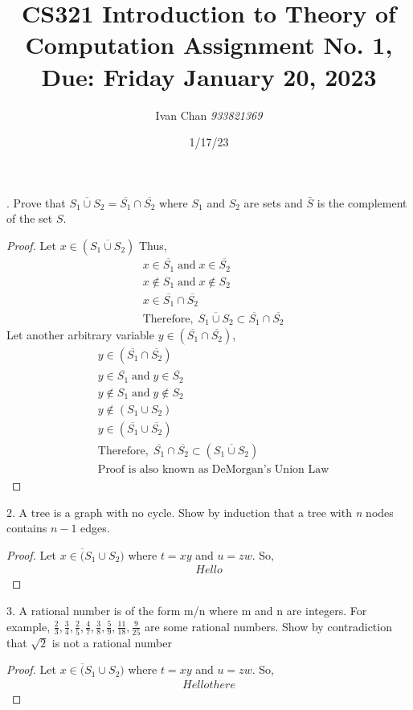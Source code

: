 \documentclass[12pt, letterpaper]{article}
\title{CS321 Introduction to Theory of Computation
Assignment No. 1, Due: Friday January 20, 2023}
\author{Ivan Chan \textit{933821369}}
\date{1/17/23}
\begin{document}
. Prove that $\overline{S_1 \cup S_2} = \overline{S_1} \cap \overline{S_2}$ where $S_1$ and $S_2$ are sets and $\bar{S}$ is the
    complement of the set $S$.
    \begin{proof}
        Let $x \in (\overline{S_1 \cup S_2})$ Thus,
        \begin{align*}
        & x \in \overline{S_1} \;\text{and}\; x \in \overline{S_2}\\
        & x \notin S_1 \;\mbox{and}\; x \notin S_2\\
        & x \in \overline{S_1} \cap \overline{S_2}\\
        & \mbox{Therefore},\; \overline{S_1 \cup S_2} \subset \overline{S_1} \cap \overline{S_2}
        \end{align*}
        Let another arbitrary variable $y \in (\overline{S_1} \cap \overline{S_2})$,
        \begin{align*}
        & y \in (\overline{S_1} \cap \overline{S_2})\\
        &    y \in \overline{S_1} \;\mbox{and}\; y \in \overline{S_2}\\
        &   y \notin S_1 \;\mbox{and}\; y \notin S_2\\
        &   y \notin (S_1 \cup S_2)\\
        &   y \in (\overline{S_1} \cup \overline{S_2})\\
        &   \mbox{Therefore}, \; \overline{S_1} \cap \overline{S_2} \subset (\overline{S_1 \cup S_2})\\
        &   \mbox{Proof is also known as DeMorgan's Union Law}
        \end{align*}
    \end{proof}


    2. A tree is a graph with no cycle. Show by induction that a tree with \textit{n}
    nodes contains $n - 1$ edges.
    \begin{proof}
        Let $x \in \overline({S_1 \cup S_2})$ where $t=xy$ and $u=zw$. So,
        \begin{align*}
            Hello
        \end{align*}
    \end{proof}

    3. A rational number is of the form m/n where m and n are integers.
    For example, $\frac{2}{3},\frac{3}{4},\frac{2}{5},\frac{4}{7},\frac{3}{8},\frac{5}{9},\frac{11}{18},\frac{9}{25}$ are some rational
    numbers. Show by contradiction that $\sqrt{2}$ is not a rational number
    \begin{proof}
        Let $x \in \overline({S_1 \cup S_2})$ where $t=xy$ and $u=zw$. So,
        \begin{align*}
            Hello there
        \end{align*}
    \end{proof}
\end{document}
